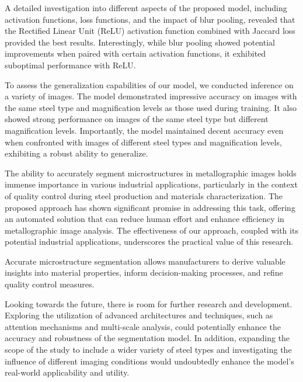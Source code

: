 \documentclass[]{article}
\begin{document}
A detailed investigation into different aspects of the proposed model, including activation functions, loss functions, and the impact of blur pooling, revealed that the Rectified Linear Unit (ReLU) activation function combined with Jaccard loss provided the best results. Interestingly, while blur pooling showed potential improvements when paired with certain activation functions, it exhibited suboptimal performance with ReLU.

To assess the generalization capabilities of our model, we conducted inference on a variety of images. The model demonstrated impressive accuracy on images with the same steel type and magnification levels as those used during training. It also showed strong performance on images of the same steel type but different magnification levels. Importantly, the model maintained decent accuracy even when confronted with images of different steel types and magnification levels, exhibiting a robust ability to generalize.

The ability to accurately segment microstructures in metallographic images holds immense importance in various industrial applications, particularly in the context of quality control during steel production and materials characterization. The proposed approach has shown significant promise in addressing this task, offering an automated solution that can reduce human effort and enhance efficiency in metallographic image analysis. The effectiveness of our approach, coupled with its potential industrial applications, underscores the practical value of this research.

Accurate microstructure segmentation allows manufacturers to derive valuable insights into material properties, inform decision-making processes, and refine quality control measures. 

Looking towards the future, there is room for further research and development. Exploring the utilization of advanced architectures and techniques, such as attention mechanisms and multi-scale analysis, could potentially enhance the accuracy and robustness of the segmentation model. In addition, expanding the scope of the study to include a wider variety of steel types and investigating the influence of different imaging conditions would undoubtedly enhance the model's real-world applicability and utility.






\end{document}
